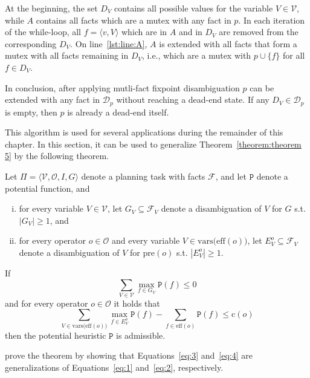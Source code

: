 At the beginning, the set $D_V$ contains all possible values for the variable $V\in\mathcal{V}$, while $A$ contains all facts which are a mutex with any fact in $p$.
In each iteration of the while-loop, all $f=\langle v, V\rangle$ which are in $A$ and in $D_V$ are removed from the corresponding $D_V$.
On line~\ref{lst:line:A}, $A$ is extended with all facts that form a mutex with all facts remaining in $D_V$, i.e., which are a mutex with $p\cup\{f\}$ for all $f\in D_V$.

In conclusion, after applying mutli-fact fixpoint disambiguation $p$ can be extended with any fact in $\mathcal{D}_p$ without reaching a dead-end state.
If any $D_V\in\mathcal{D}_p$ is empty, then $p$ is already a dead-end itself.

This algorithm is used for several applications during the remainder of this chapter.
In this section, it can be used to generalize Theorem~\ref{theorem:theorem 5} by the following theorem.

\begin{theorem}
    \label{theorem:7}
    Let $\Pi = \langle \mathcal{V}, \mathcal{O}, I, G \rangle$ denote a planning task with facts $\mathcal{F}$, and let $\mathtt{P}$ denote a potential function, and
    \begin{enumerate}[(i)]
        \item for every variable $V\in\mathcal{V}$, let $G_V\subseteq\mathcal{F}_V$ denote a disambiguation of $V$ for $G$ s.t. $|G_V|\geq1$, and
        \item for every operator $o\in\mathcal{O}$ and every variable $V\in\mathrm{vars(eff}(o))$, let $E^o_V\subseteq\mathcal{F}_V $ denote a disambiguation of $V$ for $\mathrm{pre}(o)$ s.t. $|E^o_V|\geq1$.
    \end{enumerate}

    If
    \begin{equation}\sum_{V\in\mathcal{V}}\max_{f\in G_V}\mathtt{P}(f)\leq0\label{eq:3}\end{equation}
    and for every operator $o\in\mathcal{O}$ it holds that
    \begin{equation}\sum_{V\in\mathrm{vars(eff}(o))}\max_{f\in E^o_V}\mathtt{P}(f) - \sum_{f\in\mathrm{eff}(o)}\mathtt{P}(f)\leq\mathrm{c}(o)\label{eq:4}\end{equation}
    then the potential heuristic $\mathtt{P}$ is admissible.
\end{theorem}

\citeauthor{fivser2020strengthening} prove the theorem by showing that Equations~\eqref{eq:3} and~\eqref{eq:4} are generalizations of Equations~\eqref{eq:1} and~\eqref{eq:2}, respectively.

